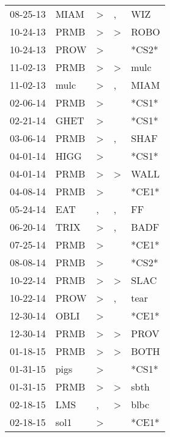 \begin{supertabular}{lllll}
 08-25-13 &   MIAM &     \textgreater &                , &    WIZ \\
 10-24-13 &   PRMB &     \textgreater &     \textgreater &   ROBO \\
 10-24-13 &   PROW &     \textgreater &                  &  *CS2* \\
 11-02-13 &   PRMB &     \textgreater &     \textgreater &   mulc \\
 11-02-13 &   mulc &     \textgreater &                , &   MIAM \\
 02-06-14 &   PRMB &     \textgreater &                  &  *CS1* \\
 02-21-14 &   GHET &     \textgreater &                  &  *CS1* \\
 03-06-14 &   PRMB &     \textgreater &                , &   SHAF \\
 04-01-14 &   HIGG &     \textgreater &                  &  *CS1* \\
 04-01-14 &   PRMB &     \textgreater &     \textgreater &   WALL \\
 04-08-14 &   PRMB &     \textgreater &                  &  *CE1* \\
 05-24-14 &    EAT &                , &                , &     FF \\
 06-20-14 &   TRIX &     \textgreater &                , &   BADF \\
 07-25-14 &   PRMB &     \textgreater &                  &  *CE1* \\
 08-08-14 &   PRMB &     \textgreater &                  &  *CS2* \\
 10-22-14 &   PRMB &     \textgreater &     \textgreater &   SLAC \\
 10-22-14 &   PROW &     \textgreater &                , &   tear \\
 12-30-14 &   OBLI &     \textgreater &                  &  *CE1* \\
 12-30-14 &   PRMB &     \textgreater &     \textgreater &   PROV \\
 01-18-15 &   PRMB &     \textgreater &     \textgreater &   BOTH \\
 01-31-15 &   pigs &     \textgreater &                  &  *CS1* \\
 01-31-15 &   PRMB &     \textgreater &     \textgreater &   sbth \\
 02-18-15 &    LMS &                , &     \textgreater &   blbc \\
 02-18-15 &   sol1 &     \textgreater &                  &  *CE1* \\

\end{supertabular}
